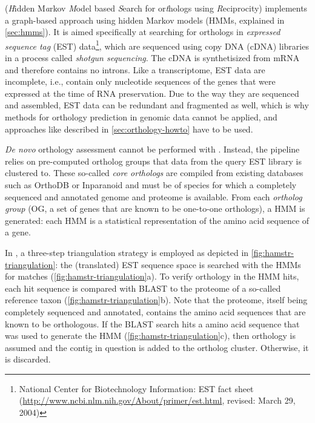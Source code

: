 \label{sec:hamstr}
\hamstr (\emph{H}idden M\emph{a}rkov \emph{M}odel based \emph{S}earch for
or\emph{t}hologs using \emph{R}eciprocity) implements a graph-based approach
using hidden Markov models (HMMs, explained in \autoref{sec:hmms}). It is aimed
specifically at searching for orthologs in \emph{expressed sequence tag} (EST)
data\footnote{National Center for Biotechnology Information: EST fact sheet
(\url{http://www.ncbi.nlm.nih.gov/About/primer/est.html}, revised: March 29,
2004)}, which are sequenced using copy DNA (cDNA) libraries in a process called
\emph{shotgun sequencing}. The cDNA is synthetisized from mRNA and therefore
contains no introns. Like a transcriptome, EST data are incomplete, i.e.,
contain only nucleotide sequences of the genes that were expressed at the time
of RNA preservation. Due to the way they are sequenced and assembled, EST data
can be redundant and fragmented as well, which is why methods for orthology
prediction in genomic data cannot be applied, and approaches like described
in \autoref{sec:orthology-howto} have to be used.

\emph{De novo} orthology assessment cannot be performed with \hamstr. Instead,
the pipeline relies on pre-computed ortholog groups that data from the query
EST library is clustered to. These so-called \emph{core orthologs} are compiled
from existing databases such as OrthoDB or Inparanoid and must be of species
for which a completely sequenced and annotated genome and proteome is
available. From each \emph{ortholog group} (OG, a set of genes that are known
to be one-to-one orthologs), a HMM is generated: each HMM is a statistical
representation of the amino acid sequence of a gene. 

In \hamstr, a three-step triangulation strategy is employed as depicted in
\autoref{fig:hamstr-triangulation}: the (translated) EST sequence space is
searched with the HMMs for matches (\autoref{fig:hamstr-triangulation}a). To
verify orthology in the HMM hits, each hit sequence is compared with BLAST
\citep{altschul1997} to the proteome of a so-called reference taxon
(\autoref{fig:hamstr-triangulation}b). Note that the proteome, itself being
completely sequenced and annotated, contains the amino acid sequences that are
known to be orthologous. If the BLAST search hits a amino acid sequence that was
used to generate the HMM (\autoref{fig:hamstr-triangulation}c), then orthology
is assumed and the contig in question is added to the ortholog cluster.
Otherwise, it is discarded.



